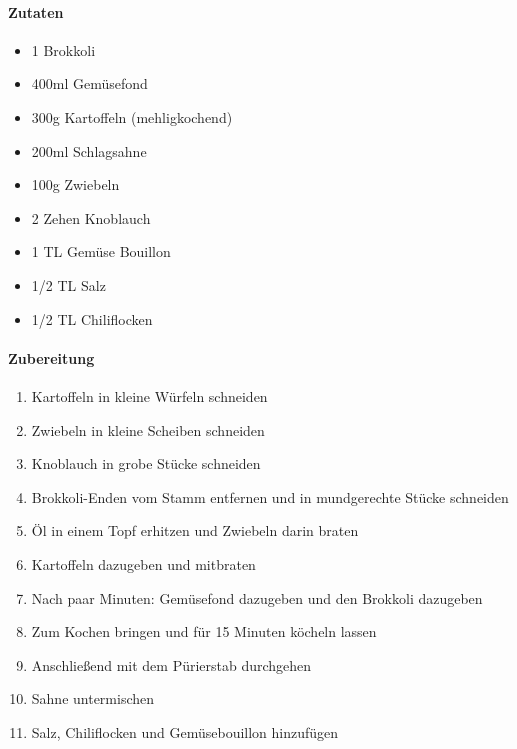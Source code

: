 \newpage
{}
\paragraph{Zutaten}
\begin{itemize}[noitemsep]
	\item 1 Brokkoli
	\item 400ml Gemüsefond
	\item 300g Kartoffeln (mehligkochend)
	\item 200ml Schlagsahne
	\item 100g Zwiebeln
	\item 2 Zehen Knoblauch
	\item 1 TL Gemüse Bouillon
	\item 1/2 TL Salz
	\item 1/2 TL Chiliflocken
\end{itemize}
\paragraph{Zubereitung}
\begin{enumerate}[noitemsep]
	\item Kartoffeln in kleine Würfeln schneiden
	\item Zwiebeln in kleine Scheiben schneiden
	\item Knoblauch in grobe Stücke schneiden
	\item Brokkoli-Enden vom Stamm entfernen und in mundgerechte Stücke schneiden
	\item Öl in einem Topf erhitzen und Zwiebeln darin braten
	\item Kartoffeln dazugeben und mitbraten
	\item Nach paar Minuten: Gemüsefond dazugeben und den Brokkoli dazugeben 
	\item Zum Kochen bringen und für 15 Minuten köcheln lassen 
	\item Anschließend mit dem Pürierstab durchgehen
	\item Sahne untermischen 
	\item Salz, Chiliflocken und Gemüsebouillon hinzufügen
\end{enumerate}
